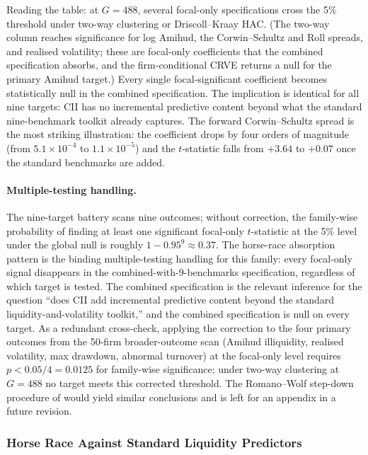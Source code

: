 \documentclass[preprint,12pt,authoryear]{elsarticle}
\begin{document}
Reading the table: at $G = 488$, several focal-only specifications cross the 5\% threshold under two-way clustering or Driscoll--Kraay HAC. (The two-way column reaches significance for log Amihud, the Corwin--Schultz and Roll spreads, and realised volatility; these are focal-only coefficients that the combined specification absorbs, and the firm-conditional CRVE returns a null for the primary Amihud target.) Every single focal-significant coefficient becomes statistically null in the combined specification. The implication is identical for all nine targets: CII has no incremental predictive content beyond what the standard nine-benchmark toolkit already captures. The forward Corwin--Schultz spread is the most striking illustration: the coefficient drops by four orders of magnitude (from $5.1 \times 10^{-4}$ to $1.1 \times 10^{-5}$) and the $t$-statistic falls from $+3.64$ to $+0.07$ once the standard benchmarks are added.

\paragraph{Multiple-testing handling.} The nine-target battery scans nine outcomes; without correction, the family-wise probability of finding at least one significant focal-only $t$-statistic at the 5\% level under the global null is roughly $1 - 0.95^{9} \approx 0.37$. The horse-race absorption pattern is the binding multiple-testing handling for this family: every focal-only signal disappears in the combined-with-9-benchmarks specification, regardless of which target is tested. The combined specification is the relevant inference for the question ``does CII add incremental predictive content beyond the standard liquidity-and-volatility toolkit,'' and the combined specification is null on every target. As a redundant cross-check, applying the \citet{bonferroni1936teoria} correction to the four primary outcomes from the 50-firm broader-outcome scan (Amihud illiquidity, realised volatility, max drawdown, abnormal turnover) at the focal-only level requires $p < 0.05/4 = 0.0125$ for family-wise significance; under two-way clustering at $G = 488$ no target meets this corrected threshold. The Romano--Wolf step-down procedure of \citet{romano2005exact} would yield similar conclusions and is left for an appendix in a future revision.

\subsubsection{Horse Race Against Standard Liquidity Predictors}
\label{sec:horse_race}
\end{document}
